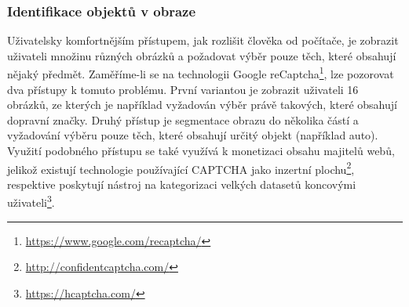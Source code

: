\documentclass[
  field=ainfp,
  master=true,
  biblatex,
  sourcecodes=false,
  theorems=false,
  glossaries,
  index
]{kidiplom}
\begin{document}
\subsubsection*{Identifikace objektů v obraze}
Uživatelsky komfortnějším přístupem, jak rozlišit člověka od počítače, je zob\-razit uživateli množinu různých obrázků a požadovat výběr pouze těch, které obsahují nějaký předmět. Zaměříme-li se na technologii Google reCaptcha\footnote{\url{https://www.google.com/recaptcha/}}, lze pozorovat dva přístupy k tomuto problému. První variantou je zobrazit uživateli 16 obrázků, ze kterých je například vyžadován výběr právě takových, které obsahují dopravní značky. Druhý přístup je segmentace obrazu do několika částí a vyžadování výběru pouze těch, které obsahují určitý objekt (například auto). Využití podobného přístupu se také využívá k monetizaci obsahu majitelů webů, jelikož existují technologie používající CAPTCHA jako inzertní plochu\footnote{\url{http://confidentcaptcha.com/}}, respektive poskytují nástroj na kategorizaci velkých datasetů koncovými uživateli\footnote{\url{https://hcaptcha.com/}}. 
\end{document}
